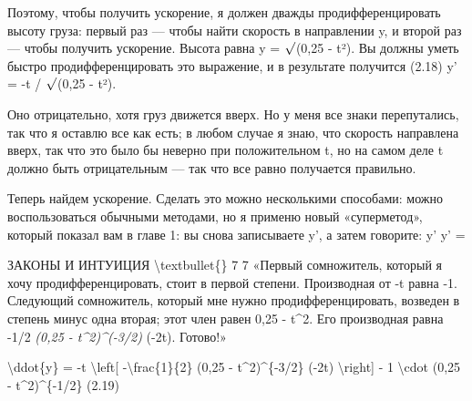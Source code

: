 \documentclass[10pt,oneside]{article}
\begin{document}
Поэтому, чтобы получить ускорение, я должен дважды продифференцировать высоту груза: первый раз --- чтобы найти скорость в направлении y, и второй раз --- чтобы получить ускорение. Высота равна y = \ensuremath{\sqrt{\vphantom{1}}}(0,25 - t²). Вы должны уметь быстро продифференцировать это выражение, и в результате получится (2.18) y' = -t / \ensuremath{\sqrt{\vphantom{1}}}(0,25 - t²).\par

Оно отрицательно, хотя груз движется вверх. Но у меня все знаки перепутались, так что я оставлю все как есть; в любом случае я знаю, что скорость направлена вверх, так что это было бы неверно при положительном t, но на самом деле t должно быть отрицательным --- так что все равно получается правильно.\par

Теперь найдем ускорение. Сделать это можно несколькими способами: можно воспользоваться обычными методами, но я применю новый «суперметод», который показал вам в главе 1: вы снова записываете y', а затем говорите: y' y' =\par

ЗАКОНЫ И ИНТУИЦИЯ \textbackslash{}textbullet\{\} 7 7 «Первый сомножитель, который я хочу продифференцировать, стоит в первой степени. Производная от -t равна -1. Следующий сомножитель, который мне нужно продифференцировать, возведен в степень минус одна вторая; этот член равен 0,25 - t\textasciicircum{}2. Его производная равна -1/2 \emph{ (0,25 - t\textasciicircum{}2)\textasciicircum{}(-3/2) } (-2t). Готово!»\par

\textbackslash{}ddot\{y\} = -t \textbackslash{}left[ -\textbackslash{}frac\{1\}\{2\} (0,25 - t\textasciicircum{}2)\textasciicircum{}\{-3/2\} (-2t) \textbackslash{}right] - 1 \textbackslash{}cdot (0,25 - t\textasciicircum{}2)\textasciicircum{}\{-1/2\} (2.19)\par
\end{document}
